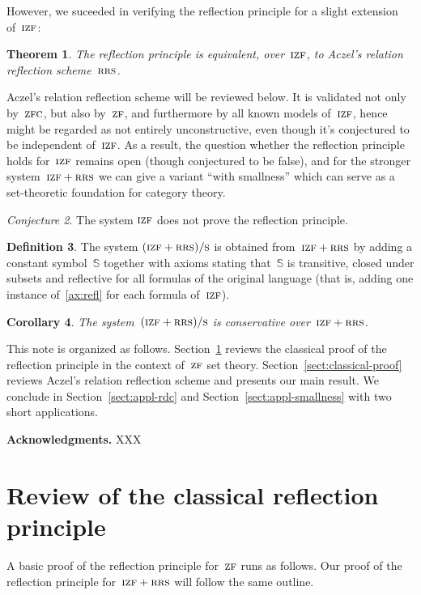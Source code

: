 \documentclass[oneside,reqno]{amsart}
\theoremstyle{definition}
\newtheorem{defn}{Definition}[section]
\theoremstyle{plain}
\newtheorem{cor}[defn]{Corollary}
\newtheorem{thm}[defn]{Theorem}
\theoremstyle{remark}
\newtheorem{conjecture}[defn]{Conjecture}
\renewcommand{\SS}{\mathbb{S}}
\renewcommand{\_}{\mathpunct{.}\,}
\newcommand{\?}{\,{:}\,}
\newcommand{\ZF}{\textsc{zf}}
\newcommand{\IZF}{\textsc{izf}}
\newcommand{\ZFC}{\textsc{zfc}}
\newcommand{\RRS}{\textsc{rrs}}
\newcommand{\ES}{(\IZF+\RRS)/\textsc{s}}
\begin{document}
However, we suceeded in verifying the reflection principle for a slight
extension of~$\IZF$:

\begin{thm}The reflection principle is equivalent, over~$\IZF$, to Aczel's relation reflection
scheme~$\RRS$.\end{thm}

Aczel's relation reflection scheme will be reviewed below. It is validated not
only by~$\ZFC$, but also by~$\ZF$, and furthermore by
all known models of~$\IZF$, hence might be regarded as not entirely
unconstructive, even though it's conjectured to be independent of~$\IZF$. As a
result, the question whether the reflection principle holds for~$\IZF$ remains
open (though conjectured to be false), and for the stronger system~$\IZF+\RRS$
we can give a variant ``with smallness'' which can serve as a set-theoretic
foundation for category theory.

\begin{conjecture}The system $\IZF$ does not prove the reflection
principle.\end{conjecture}

\begin{defn}The system $\ES$ is obtained from~$\IZF+\RRS$ by
adding a constant symbol~$\SS$ together with axioms
stating that~$\SS$ is transitive, closed under subsets and reflective for all
formulas of the original language (that is, adding one instance
of~\eqref{ax:refl} for each formula of~$\IZF$).\end{defn}

\begin{cor}The system~$\ES$ is conservative
over~$\IZF+\RRS$.\end{cor}

This note is organized as follows. Section~\ref{sect:review} reviews the
classical proof of the reflection principle in the context of~$\ZF$ set theory.
Section~\ref{sect:classical-proof} reviews Aczel's relation reflection scheme
and presents our main result. We conclude in Section~\ref{sect:appl-rdc} and
Section~\ref{sect:appl-smallness} with two short applications.

\textbf{Acknowledgments.} XXX


\section{Review of the classical reflection principle}
\label{sect:review}

A basic proof of the reflection principle for~$\ZF$ runs as follows. Our proof
of the reflection principle for~$\IZF+\RRS$ will follow the same outline.
\end{document}
